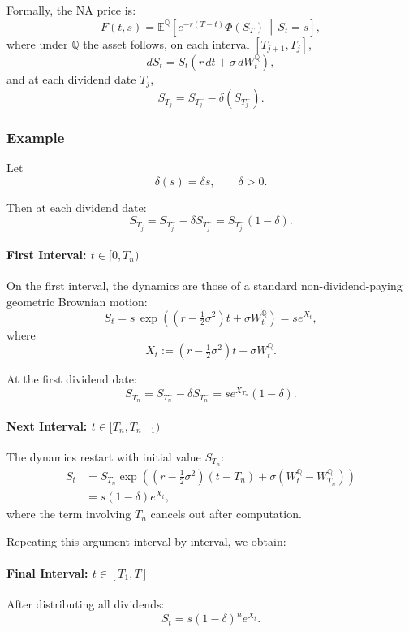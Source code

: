 \documentclass[12pt,a4paper]{article}
\theoremstyle{definition}
\begin{document}
Formally, the NA price is:
\[
F(t, s) = \mathbb{E}^\mathbb{Q}\left[e^{-r(T-t)} \Phi(S_T) \,\middle|\, S_t=s \right],
\]
where under $\mathbb{Q}$ the asset follows, on each interval $[T_{j+1}, T_j]$,
\[
dS_t = S_t \left( r\, dt + \sigma\, dW_t^\mathbb{Q} \right),
\]
and at each dividend date $T_j$,
\[
S_{T_j} = S_{T_j^-} - \delta(S_{T_j^-}).
\]

\subsubsection{Example}

Let
\[
\delta(s) = \delta s, \qquad \delta>0.
\]

Then at each dividend date:
\[
S_{T_j} = S_{T_j^-} - \delta S_{T_j^-} = S_{T_j^-}(1-\delta).
\]

\paragraph{First Interval: $t \in [0, T_n)$}

On the first interval, the dynamics are those of a standard non-dividend-paying geometric Brownian motion:
\[
S_t = s\,\exp\left((r - \tfrac{1}{2}\sigma^2)t + \sigma W_t^\mathbb{Q}\right) = s e^{X_t},
\]
where
\[
X_t := (r - \tfrac{1}{2}\sigma^2)t + \sigma W_t^\mathbb{Q}.
\]

At the first dividend date:
\[
S_{T_n} = S_{T_n^-} - \delta S_{T_n^-} = s e^{X_{T_n}} (1-\delta).
\]

\paragraph{Next Interval: $t \in [T_n, T_{n-1})$}

The dynamics restart with initial value $S_{T_n}$:
\[
\begin{aligned}
S_t &= S_{T_n} \exp\left((r - \tfrac{1}{2}\sigma^2)(t - T_n) + \sigma (W_t^\mathbb{Q} - W_{T_n}^\mathbb{Q})\right) \\
&= s (1-\delta) e^{X_t},
\end{aligned}
\]
where the term involving $T_n$ cancels out after computation.

Repeating this argument interval by interval, we obtain:

\paragraph{Final Interval: $t \in [T_1, T]$}

After distributing all dividends:
\[
S_t = s (1-\delta)^n e^{X_t}.
\]
\end{document}
